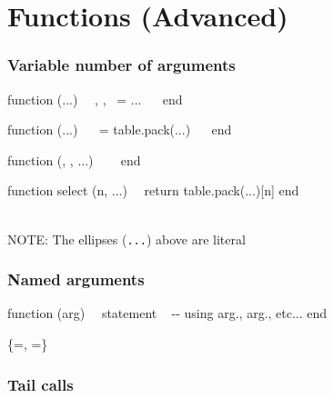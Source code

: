 \documentclass{refcard}
\newcommand{\X}{\I{x}}
\newcommand{\Y}{\I{y}}
\newcommand{\F}{\I{f}}
\begin{document}
%



\section{Functions (Advanced)}

\subsubsection{Variable number of arguments}

\begin{ldesc}
		function \F (...) \li
		~~, , ~= ... \li
		~~ \li
		end

		function \F (...) \li
		~~ = table.pack(...) \li
		~~ \li
		end

		function \F (\X, \Y, ...)~\li
		~~ \li
		end

		function select (n, ...) \li
		~~return table.pack(...)[n] \li
		end
\end{ldesc} \\[1ex]

{NOTE: The ellipses (\texttt{...}) above are literal}

\subsubsection{Named arguments}

\begin{ldesc}
	\li[declaration]
		function \F (arg) \li
		~~statement ~ -{-} using arg., arg., etc... \li
		end

	\li[call]
		\F\{=\X, =\Y\}

\end{ldesc}

\subsubsection{Tail calls}
\end{document}
